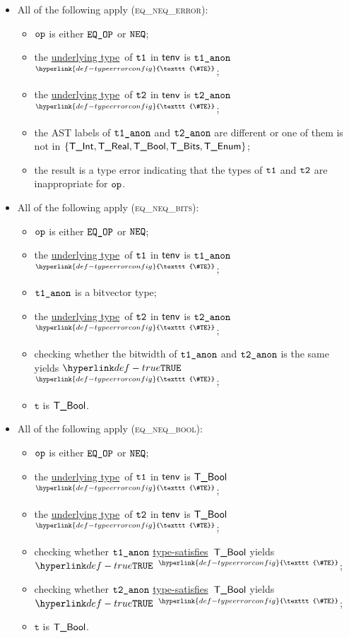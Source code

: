 \documentclass{book}
\newcommand\TypeErrorConfig[0]{\hyperlink{def-typeerrorconfig}{\texttt{\#TE}}}
\newcommand\ProseOrTypeError[0]{\hyperlink{def-proseortypeerror}{$^{\TypeErrorConfig}$}}
\newcommand\underlyingtype[0]{\hyperlink{def-underlyingtype}{underlying type}}
\newcommand\typesatisfies[0]{\hyperlink{def-typesatisfies}{type-satisfies}}
\newcommand\vt[0]{\texttt{t}}
\begin{document}
\begin{itemize}
  \item All of the following apply (\textsc{eq\_neq\_error}):
  \begin{itemize}
    \item $\texttt{op}$ is either $\texttt{EQ\_OP}$ or $\texttt{NEQ}$;
    \item the \underlyingtype\ of $\texttt{t1}$ in $\textsf{tenv}$ is $\texttt{t1\_anon}$ \ProseOrTypeError;
    \item the \underlyingtype\ of $\texttt{t2}$ in $\textsf{tenv}$ is $\texttt{t2\_anon}$ \ProseOrTypeError;
    \item the AST labels of $\texttt{t1\_anon}$ and $\texttt{t2\_anon}$ are different or one of them is not in
          $\{\textsf{T\_Int}, \textsf{T\_Real}, \textsf{T\_Bool}, \textsf{T\_Bits}, \textsf{T\_Enum}\}$;
    \item the result is a type error indicating that the types of $\texttt{t1}$ and $\texttt{t2}$ are inappropriate for $\texttt{op}$.
  \end{itemize}

  \item All of the following apply (\textsc{eq\_neq\_bits}):
  \begin{itemize}
    \item $\texttt{op}$ is either $\texttt{EQ\_OP}$ or $\texttt{NEQ}$;
    \item the \underlyingtype\ of $\texttt{t1}$ in $\textsf{tenv}$ is $\texttt{t1\_anon}$ \ProseOrTypeError;
    \item $\texttt{t1\_anon}$ is a bitvector type;
    \item the \underlyingtype\ of $\texttt{t2}$ in $\textsf{tenv}$ is $\texttt{t2\_anon}$ \ProseOrTypeError;
    \item checking whether the bitwidth of $\texttt{t1\_anon}$ and $\texttt{t2\_anon}$ is the same yields $\True$ \ProseOrTypeError;
    \item $\vt$ is $\textsf{T\_Bool}$.
  \end{itemize}

  \item All of the following apply (\textsc{eq\_neq\_bool}):
  \begin{itemize}
    \item $\texttt{op}$ is either $\texttt{EQ\_OP}$ or $\texttt{NEQ}$;
    \item the \underlyingtype\ of $\texttt{t1}$ in $\textsf{tenv}$ is $\textsf{T\_Bool}$ \ProseOrTypeError;
    \item the \underlyingtype\ of $\texttt{t2}$ in $\textsf{tenv}$ is $\textsf{T\_Bool}$ \ProseOrTypeError;
    \item checking whether $\texttt{t1\_anon}$ \typesatisfies\ $\textsf{T\_Bool}$ yields $\True$ \ProseOrTypeError;
    \item checking whether $\texttt{t2\_anon}$ \typesatisfies\ $\textsf{T\_Bool}$ yields $\True$ \ProseOrTypeError;
    \item $\vt$ is $\textsf{T\_Bool}$.
  \end{itemize}


\end{itemize}
\end{document}
